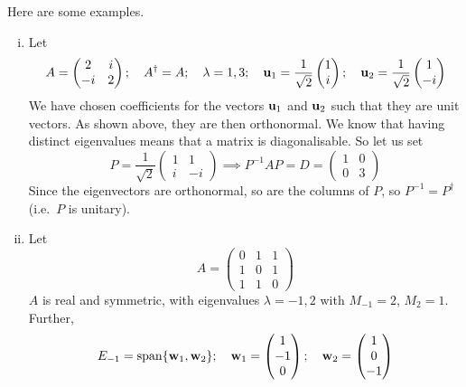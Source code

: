Here are some examples.
\begin{enumerate}[(i)]
	\item Let
	      \[
		      A = \begin{pmatrix}
			      2 & i \\ -i & 2
		      \end{pmatrix};\quad A^\dagger = A;\quad \lambda = 1, 3;\quad\vb u_1 = \frac{1}{\sqrt{2}} \begin{pmatrix}
			      1 \\i
		      \end{pmatrix};\quad\vb u_2 = \frac{1}{\sqrt{2}} \begin{pmatrix}
			      1 \\-i
		      \end{pmatrix}
	      \]
	      We have chosen coefficients for the vectors \(\vb u_1\) and \(\vb u_2\) such that they are unit vectors.
	      As shown above, they are then orthonormal.
	      We know that having distinct eigenvalues means that a matrix is diagonalisable.
	      So let us set
	      \[
		      P =  \frac{1}{\sqrt{2}} \begin{pmatrix}
			      1 & 1 \\ i & -i
		      \end{pmatrix} \implies P^{-1}AP = D = \begin{pmatrix}
			      1 & 0 \\ 0 & 3
		      \end{pmatrix}
	      \]
	      Since the eigenvectors are orthonormal, so are the columns of \(P\), so \(P^{-1} = P^\dagger\) (i.e.\ \(P\) is unitary).
	\item Let
	      \[
		      A = \begin{pmatrix}
			      0 & 1 & 1 \\ 1 & 0 & 1 \\ 1 & 1 & 0
		      \end{pmatrix}
	      \]
	      \(A\) is real and symmetric, with eigenvalues \(\lambda = -1, 2\) with \(M_{-1} = 2\), \(M_2 = 1\).
	      Further,
	      \[
		      E_{-1} = \operatorname{span} \{ \vb w_1, \vb w_2 \};\quad \vb w_1 = \begin{pmatrix}
			      1 \\ -1 \\ 0
		      \end{pmatrix};\quad \vb w_2 = \begin{pmatrix}
			      1 \\ 0 \\ -1
		      \end{pmatrix}
\]
\end{enumerate}
